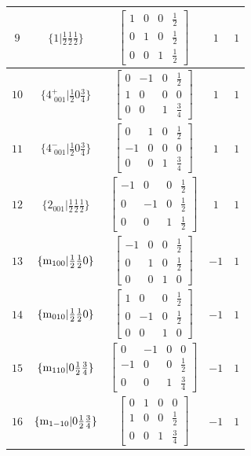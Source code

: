 \documentclass[fleqn,8pt]{jsarticle}
\begin{document}
\begin{longtable}{ccccc}
$ 9 $ & $ \{1|\frac{1}{2} \frac{1}{2} \frac{1}{2}\} $ & $ \begin{bmatrix} 1 & 0 & 0 & \frac{1}{2} \\ 0 & 1 & 0 & \frac{1}{2} \\ 0 & 0 & 1 & \frac{1}{2} \end{bmatrix} $ & $ 1 $ & $ 1 $ \\ \hline
$ 10 $ & $ \{4^{+}_{\,\,001}|\frac{1}{2} 0 \frac{3}{4}\} $ & $ \begin{bmatrix} 0 & -1 & 0 & \frac{1}{2} \\ 1 & 0 & 0 & 0 \\ 0 & 0 & 1 & \frac{3}{4} \end{bmatrix} $ & $ 1 $ & $ 1 $ \\ \hline
$ 11 $ & $ \{4^{-}_{\,\,001}|\frac{1}{2} 0 \frac{3}{4}\} $ & $ \begin{bmatrix} 0 & 1 & 0 & \frac{1}{2} \\ -1 & 0 & 0 & 0 \\ 0 & 0 & 1 & \frac{3}{4} \end{bmatrix} $ & $ 1 $ & $ 1 $ \\ \hline
$ 12 $ & $ \{2{}_{001}|\frac{1}{2} \frac{1}{2} \frac{1}{2}\} $ & $ \begin{bmatrix} -1 & 0 & 0 & \frac{1}{2} \\ 0 & -1 & 0 & \frac{1}{2} \\ 0 & 0 & 1 & \frac{1}{2} \end{bmatrix} $ & $ 1 $ & $ 1 $ \\ \hline
$ 13 $ & $ \{{\rm m}_{100}|\frac{1}{2} \frac{1}{2} 0\} $ & $ \begin{bmatrix} -1 & 0 & 0 & \frac{1}{2} \\ 0 & 1 & 0 & \frac{1}{2} \\ 0 & 0 & 1 & 0 \end{bmatrix} $ & $ -1 $ & $ 1 $ \\ \hline
$ 14 $ & $ \{{\rm m}_{010}|\frac{1}{2} \frac{1}{2} 0\} $ & $ \begin{bmatrix} 1 & 0 & 0 & \frac{1}{2} \\ 0 & -1 & 0 & \frac{1}{2} \\ 0 & 0 & 1 & 0 \end{bmatrix} $ & $ -1 $ & $ 1 $ \\ \hline
$ 15 $ & $ \{{\rm m}_{110}|0 \frac{1}{2} \frac{3}{4}\} $ & $ \begin{bmatrix} 0 & -1 & 0 & 0 \\ -1 & 0 & 0 & \frac{1}{2} \\ 0 & 0 & 1 & \frac{3}{4} \end{bmatrix} $ & $ -1 $ & $ 1 $ \\ \hline
$ 16 $ & $ \{{\rm m}_{1-10}|0 \frac{1}{2} \frac{3}{4}\} $ & $ \begin{bmatrix} 0 & 1 & 0 & 0 \\ 1 & 0 & 0 & \frac{1}{2} \\ 0 & 0 & 1 & \frac{3}{4} \end{bmatrix} $ & $ -1 $ & $ 1 $ \\
\end{longtable}
\end{document}
